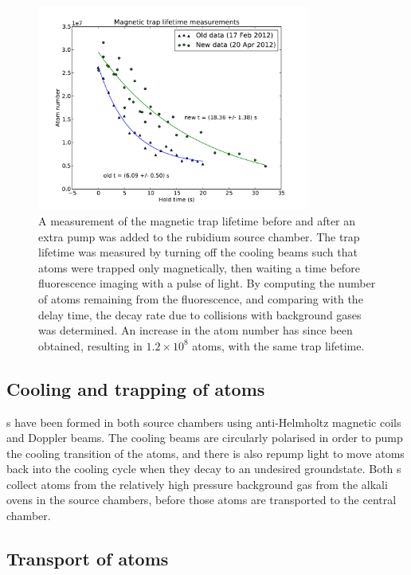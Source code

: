 \begin{figure}
\begin{center}
\includegraphics[width=0.8\textwidth]{figures/unsorted/lifetimes.pdf}
\caption{\label{fig:lifetime} A measurement of the magnetic trap lifetime before and after an extra pump was added to the rubidium source chamber. The trap lifetime was measured by turning off the cooling beams such that atoms were trapped only magnetically, then waiting a time before fluorescence imaging with a pulse of light. By computing the number of atoms remaining from the fluorescence, and comparing with the delay time, the decay rate due to collisions with background gases was determined. An increase in the atom number has since been obtained, resulting in $1.2\times10^8$ atoms, with the same trap lifetime.}
\end{center}
\end{figure}

\subsection{Cooling and trapping of atoms}

\mot s have been formed in both source chambers using anti-Helmholtz magnetic coils and Doppler beams. The cooling beams are circularly polarised in order to pump the cooling transition of the atoms, and there is also repump light to move atoms back into the cooling cycle when they decay to an undesired groundstate. Both \mot s collect atoms from the relatively high pressure background gas from the alkali ovens in the source chambers, before those atoms are transported to the central chamber.

\subsection{Transport of atoms}

